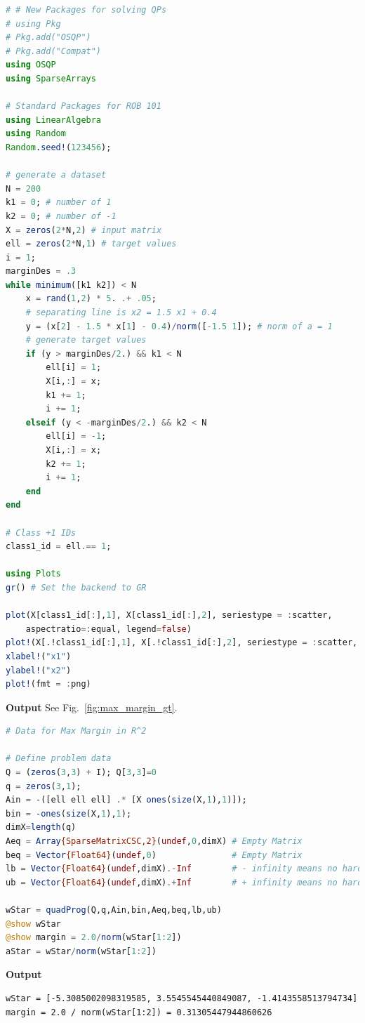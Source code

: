 \begin{lstlisting}[language=Julia,style=mystyle]
# # New Packages for solving QPs
# using Pkg
# Pkg.add("OSQP")
# Pkg.add("Compat")
using OSQP
using SparseArrays

# Standard Packages for ROB 101
using LinearAlgebra 
using Random
Random.seed!(123456);

# generate a dataset
N = 200
k1 = 0; # number of 1
k2 = 0; # number of -1
X = zeros(2*N,2) # input matrix
ell = zeros(2*N,1) # target values
i = 1;
marginDes = .3
while minimum([k1 k2]) < N
    x = rand(1,2) * 5. .+ .05;
    # separating line is x2 = 1.5 x1 + 0.4
    y = (x[2] - 1.5 * x[1] - 0.4)/norm([-1.5 1]); # norm of a = 1
    # generate target values
    if (y > marginDes/2.) && k1 < N
        ell[i] = 1;
        X[i,:] = x;
        k1 += 1;
        i += 1;
    elseif (y < -marginDes/2.) && k2 < N
        ell[i] = -1;
        X[i,:] = x;
        k2 += 1;
        i += 1;
    end
end

# Class +1 IDs
class1_id = ell.== 1;

using Plots
gr() # Set the backend to GR

plot(X[class1_id[:],1], X[class1_id[:],2], seriestype = :scatter, 
    aspectratio=:equal, legend=false)
plot!(X[.!class1_id[:],1], X[.!class1_id[:],2], seriestype = :scatter, xlims = (0,6), ylims = (0,6))
xlabel!("x1")
ylabel!("x2")
plot!(fmt = :png)

\end{lstlisting}
\textbf{Output} 
See Fig.~\ref{fig:max_margin_gt}.

\begin{lstlisting}[language=Julia,style=mystyle]
# Data for Max Margin in R^2

# Define problem data
Q = (zeros(3,3) + I); Q[3,3]=0
q = zeros(3,1);
Ain = -([ell ell ell] .* [X ones(size(X,1),1)]);
bin = -ones(size(X,1),1);
dimX=length(q)
Aeq = Array{SparseMatrixCSC,2}(undef,0,dimX) # Empty Matrix
beq = Vector{Float64}(undef,0)               # Empty Matrix
lb = Vector{Float64}(undef,dimX).-Inf        # - infinity means no hard lower bound
ub = Vector{Float64}(undef,dimX).+Inf        # + infinity means no hard upper bound

wStar = quadProg(Q,q,Ain,bin,Aeq,beq,lb,ub)
@show wStar
@show margin = 2.0/norm(wStar[1:2])
aStar = wStar/norm(wStar[1:2])

\end{lstlisting}
\textbf{Output} 
\begin{verbatim}
wStar = [-5.3085002098319585, 3.5545545440849087, -1.4143558513794734]
margin = 2.0 / norm(wStar[1:2]) = 0.31305447944860626
\end{verbatim}

